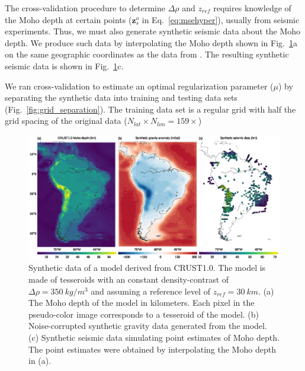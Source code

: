 \documentclass[extra]{gji}
\begin{document}
The cross-validation procedure to determine $\Delta\rho$ and $z_{ref}$
requires knowledge of the Moho depth at certain points
($\mathbf{z}_s^o$ in Eq.~\ref{eq:msehyper}),
usually from seismic experiments.
Thus, we must also generate synthetic seismic data about the Moho depth.
We produce such data by interpolating the Moho depth shown in
Fig.~\ref{fig:crust1-data}a on the same geographic coordinates as the
data from \citet{assumpcao2012}.
The resulting synthetic seismic data is shown in Fig.~\ref{fig:crust1-data}c.

We ran cross-validation to estimate an optimal regularization parameter ($\mu$)
by separating the synthetic data into training and testing data sets
(Fig.~\ref{fig:grid_separation}).
The training data set is a regular grid
with half the grid spacing of the original data
($N_{lat} \times N_{lon} = 159 \times $)

\begin{figure}
    \centering
    \includegraphics[width=\textwidth]{figures/synthetic-crust1-data}
    \caption{
        Synthetic data of a model derived from CRUST1.0.
        The model is made of tesseroids with an constant density-contrast
        of $\Delta\rho = 350\ kg/m^3$ and assuming a reference level of
        $z_{ref} = 30\ km$.
        (a) The Moho depth of the model in kilometers.
        Each pixel in the pseudo-color image corresponds to a tesseroid of the
        model.
        (b) Noise-corrupted synthetic gravity data generated from the model.
        (c) Synthetic seismic data simulating point estimates of Moho depth.
        The point estimates were obtained by interpolating
        the Moho depth in (a).
    }
    \label{fig:crust1-data}
\end{figure}
\end{document}
